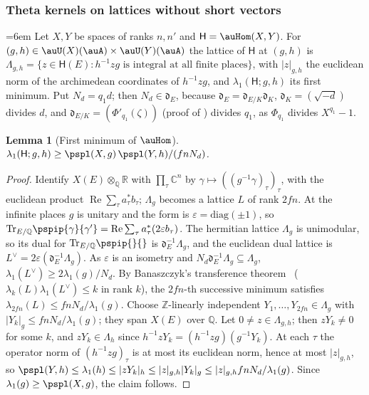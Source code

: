 \documentclass[10pt]{amsart}
\newtheorem{lemma}[theorem]{Lemma}
\theoremstyle{definition}
\theoremstyle{remark}
\newcommand{\C}{\mathbb C}
\newcommand{\R}{\mathbb R}
\newcommand{\Z}{\mathbb Z}
\newcommand{\Q}{\mathbb Q}
\newcommand{\Rel}{\operatorname{Re}}
\begin{document}
\subsubsection{Theta kernels on lattices without short vectors}\label{psp:ss-sparse}

{\emergencystretch=6em Let $X,Y$ be spaces of ranks $n,n'$ and $\mathsf H=\auHom(X,Y)$. For $(g,h)\in\auU(X)(\auA)\times
\auU(Y)(\auA)$ the lattice of $\mathsf H$ at $(g,h)$ is $\Lambda_{g,h}=\{z\in\mathsf H(E):\allowbreak h^{-1}zg
\text{ is integral at all finite places}\}$, with $|z|_{g,h}$ the euclidean norm of the archimedean
coordinates of $h^{-1}zg$, and $\lambda_1(\mathsf H;g,h)$ its first minimum. Put $N_d=q_1d$; then
$N_d\in\mathfrak d_E$, because $\mathfrak d_E=\mathfrak d_{E/K}\mathfrak d_K$, $\mathfrak d_K=
(\sqrt{-d})$ divides $d$, and $\mathfrak d_{E/K}=(\Phi'_{q_1}(\zeta))$ (proof of
{\cite[Lemma~5.10]{P51}}) divides $q_1$, as $\Phi_{q_1}$ divides $X^{q_1}-1$.\par}

\begin{lemma}[First minimum of $\auHom$]\label{psp:hom}
$\lambda_1(\mathsf H;g,h)\ge\pspl(X,g)\,\pspl(Y,h)/(fnN_d)$.
\end{lemma}
\begin{proof}
Identify $X(E)\otimes_\Q\R$ with $\prod_\tau\C^n$ by $\gamma\mapsto((g^{-1}\gamma)_\tau)_\tau$, with the
euclidean product $\Rel\sum_\tau a_\tau^*b_\tau$; $\Lambda_g$ becomes a lattice $L$ of rank $2fn$. At
the infinite places $g$ is unitary and the form is $\varepsilon=\mathrm{diag}(\pm1)$, so
$\mathrm{Tr}_{E/\Q}\pspip{\gamma}{\gamma'}=\Rel\sum_\tau a_\tau^*(2\varepsilon b_\tau)$. The hermitian
lattice $\Lambda_g$ is unimodular, so its dual for $\mathrm{Tr}_{E/\Q}\pspip{}{}$ is $\mathfrak
d_E^{-1}\Lambda_g$, and the euclidean dual lattice is $L^\vee=2\varepsilon(\mathfrak d_E^{-1}
\Lambda_g)$. As $\varepsilon$ is an isometry and $N_d\mathfrak d_E^{-1}\Lambda_g\subseteq\Lambda_g$,
$\lambda_1(L^\vee)\ge2\lambda_1(g)/N_d$. By Banaszczyk's transference theorem~\cite[Theorem~2.1]{Banaszczyk}
($\lambda_k(L)\lambda_1(L^\vee)\le k$ in rank $k$), the $2fn$-th successive
minimum satisfies $\lambda_{2fn}(L)\le fnN_d/\lambda_1(g)$. Choose $\Z$-linearly independent
$Y_1,\dots,Y_{2fn}\in\Lambda_g$ with $|Y_k|_g\le fnN_d/\lambda_1(g)$; they span $X(E)$ over $\Q$. Let
$0\ne z\in\Lambda_{g,h}$; then $zY_k\ne0$ for some $k$, and $zY_k\in\Lambda_h$ since $h^{-1}zY_k=
(h^{-1}zg)(g^{-1}Y_k)$. At each $\tau$ the operator norm of $(h^{-1}zg)_\tau$ is at most its euclidean
norm, hence at most $|z|_{g,h}$, so $\pspl(Y,h)\le\lambda_1(h)\le|zY_k|_h\le|z|_{g,h}|Y_k|_g\le
|z|_{g,h}fnN_d/\lambda_1(g)$. Since $\lambda_1(g)\ge\pspl(X,g)$, the claim follows.
\end{proof}
\end{document}
